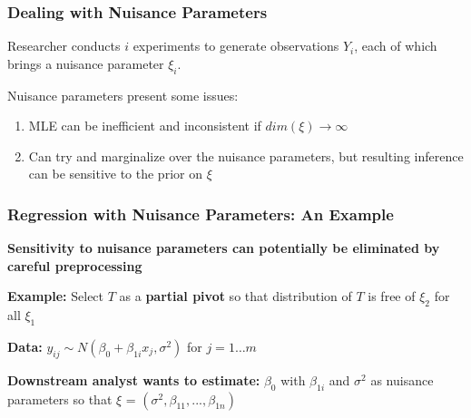\documentclass[10pt, compress]{beamer}
\begin{document}
\begin{frame}[fragile]
    \frametitle{Dealing with Nuisance Parameters}

    Researcher conducts $i$ experiments to generate observations $Y_i$, each of which brings a nuisance parameter $\xi_i$. 
    
    
    Nuisance parameters present some issues:
    \begin{enumerate}
    \item MLE can be inefficient and inconsistent if $dim(\xi) \to\infty$
    \item Can try and marginalize over the nuisance parameters, but resulting inference can be sensitive to the prior on $\xi$
    \end{enumerate}
    
\end{frame}

\begin{frame}[fragile]

    \frametitle{Regression with Nuisance Parameters: An Example}
    
    \textbf{Sensitivity to nuisance parameters can potentially be eliminated by careful preprocessing}

    \vspace*{5mm}
    
    \textbf{Example:} Select $T$ as a \textbf{partial pivot} so that distribution of $T$ is free of $\xi_2$ for all $\xi_1$ 

    \vspace*{5mm}
    
    \textbf{Data:} $y_{ij} \sim N(\beta_0 + \beta_{1i}x_j, \sigma^2)$ for $j = 1 \ldots m$
    
    \textbf{Downstream analyst wants to estimate:} $\beta_0$ with $\beta_{1i}$ and $\sigma^2$ as nuisance parameters so that $\xi$ = $(\sigma^2, \beta_{11}, ..., \beta_{1n})$
    
\end{frame}
\end{document}
